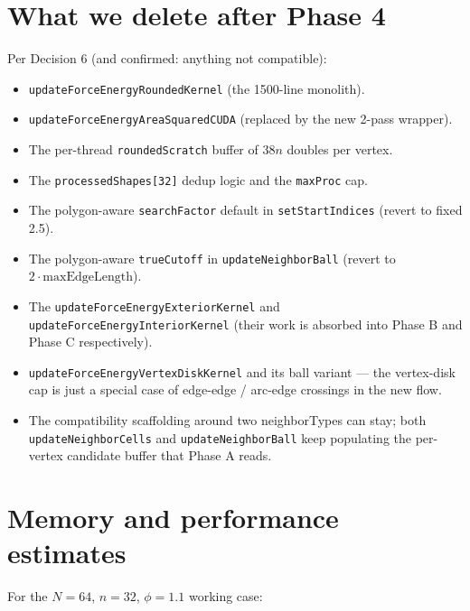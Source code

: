 \documentclass[11pt]{article}
\newcommand{\code}[1]{\texttt{#1}}
\begin{document}
\section{What we delete after Phase 4}\label{sec:delete}

Per Decision 6 (and confirmed: anything not compatible):

\begin{itemize}[leftmargin=*]
  \item \code{updateForceEnergyRoundedKernel} (the 1500-line monolith).
  \item \code{updateForceEnergyAreaSquaredCUDA} (replaced by the new
        2-pass wrapper).
  \item The per-thread \code{roundedScratch} buffer of $38n$ doubles
        per vertex.
  \item The \code{processedShapes[32]} dedup logic and the
        \code{maxProc} cap.
  \item The polygon-aware \code{searchFactor} default in
        \code{setStartIndices} (revert to fixed 2.5).
  \item The polygon-aware \code{trueCutoff} in
        \code{updateNeighborBall} (revert to $2 \cdot
        \text{maxEdgeLength}$).
  \item The \code{updateForceEnergyExteriorKernel} and
        \code{updateForceEnergyInteriorKernel} (their work is absorbed
        into Phase B and Phase C respectively).
  \item \code{updateForceEnergyVertexDiskKernel} and its ball variant
        --- the vertex-disk cap is just a special case of
        edge-edge / arc-edge crossings in the new flow.
  \item The compatibility scaffolding around two neighborTypes can
        stay; both \code{updateNeighborCells} and
        \code{updateNeighborBall} keep populating the per-vertex
        candidate buffer that Phase A reads.
\end{itemize}

\section{Memory and performance estimates}\label{sec:perf-estimates}

For the $N{=}64$, $n{=}32$, $\phi{=}1.1$ working case:
\end{document}
